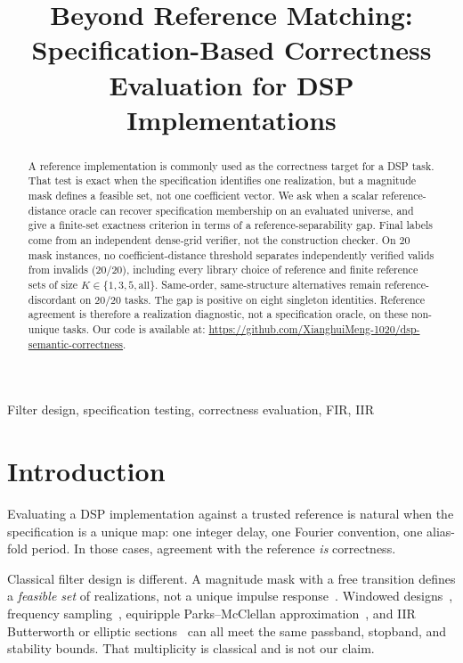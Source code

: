 \documentclass{article}
\title{Beyond Reference Matching: Specification-Based Correctness\\
Evaluation for DSP Implementations}
\begin{document}
\maketitle

\begin{abstract}
A reference implementation is commonly used as the correctness
target for a DSP task.
That test is exact when the specification identifies one realization,
but a magnitude mask defines a feasible set, not one coefficient
vector.
We ask when a scalar reference-distance oracle can recover
specification membership on an evaluated universe, and give a
finite-set exactness criterion in terms of a reference-separability
gap.
Final labels come from an independent dense-grid verifier, not the
construction checker.
On 20 mask instances, no coefficient-distance threshold separates
independently verified valids from invalids ($20/20$), including
every library choice of reference and finite reference sets of size
$K\in\{1,3,5,\mathrm{all}\}$.
Same-order, same-structure alternatives remain reference-discordant
on $20/20$ tasks.
The gap is positive on eight singleton identities.
Reference agreement is therefore a realization diagnostic, not a
specification oracle, on these non-unique tasks.
Our code is available at:
\url{https://github.com/XianghuiMeng-1020/dsp-semantic-correctness}.
\end{abstract}

\begin{keywords}
Filter design, specification testing, correctness evaluation, FIR, IIR
\end{keywords}

\section{Introduction}
\label{sec:intro}

Evaluating a DSP implementation against a trusted reference is
natural when the specification is a unique map: one integer delay,
one Fourier convention, one alias-fold period.
In those cases, agreement with the reference \emph{is} correctness.

Classical filter design is different.
A magnitude mask with a free transition defines a
\emph{feasible set} of realizations, not a unique impulse
response~\cite{oppenheim2010dsp,proakis2007dsp,mitra2011dsp,rabiner1975theory}.
Windowed designs~\cite{kaiser1974window,harris1978windows},
frequency sampling~\cite{rabiner1970freqsamp},
equiripple Parks--McClellan
approximation~\cite{parks1972chebyshev,mcclellan1973computer,rabiner1975fir},
and IIR Butterworth or elliptic
sections~\cite{butterworth1930,constantinides1970,jackson1996filters,antoniou2006filters}
can all meet the same passband, stopband, and stability bounds.
That multiplicity is classical and is not our claim.
\end{document}
